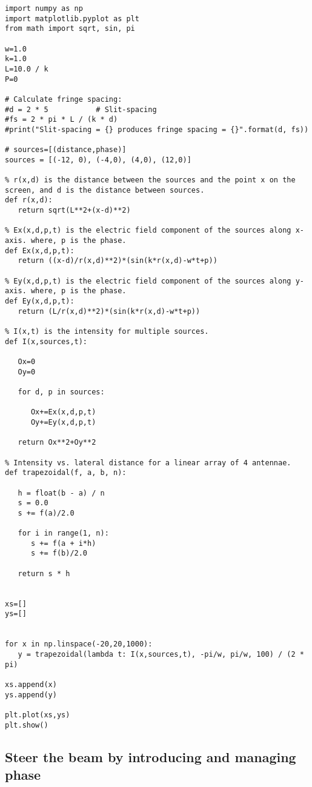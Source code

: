 \begin{Verbatim}[fontsize=\small,baselinestretch=0.9]
import numpy as np
import matplotlib.pyplot as plt
from math import sqrt, sin, pi

w=1.0
k=1.0
L=10.0 / k
P=0

# Calculate fringe spacing:
#d = 2 * 5           # Slit-spacing
#fs = 2 * pi * L / (k * d)
#print("Slit-spacing = {} produces fringe spacing = {}".format(d, fs))

# sources=[(distance,phase)]
sources = [(-12, 0), (-4,0), (4,0), (12,0)]

% r(x,d) is the distance between the sources and the point x on the screen, and d is the distance between sources.
def r(x,d):
   return sqrt(L**2+(x-d)**2)

% Ex(x,d,p,t) is the electric field component of the sources along x-axis. where, p is the phase.
def Ex(x,d,p,t):
   return ((x-d)/r(x,d)**2)*(sin(k*r(x,d)-w*t+p))

% Ey(x,d,p,t) is the electric field component of the sources along y-axis. where, p is the phase.
def Ey(x,d,p,t):
   return (L/r(x,d)**2)*(sin(k*r(x,d)-w*t+p))

% I(x,t) is the intensity for multiple sources.
def I(x,sources,t):

   Ox=0
   Oy=0

   for d, p in sources:

      Ox+=Ex(x,d,p,t)
      Oy+=Ey(x,d,p,t)

   return Ox**2+Oy**2

% Intensity vs. lateral distance for a linear array of 4 antennae.
def trapezoidal(f, a, b, n):

   h = float(b - a) / n
   s = 0.0
   s += f(a)/2.0

   for i in range(1, n):
      s += f(a + i*h)
      s += f(b)/2.0

   return s * h


xs=[]
ys=[]


for x in np.linspace(-20,20,1000):
   y = trapezoidal(lambda t: I(x,sources,t), -pi/w, pi/w, 100) / (2 * pi)

xs.append(x)
ys.append(y)

plt.plot(xs,ys)
plt.show()   
\end{Verbatim}

\subsection{Steer the beam by introducing and managing phase}

